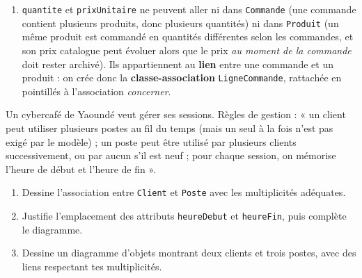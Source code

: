 \documentclass[11pt]{article}
\begin{document}
\begin{exoresolu}
\begin{enumerate}
\begin{center}
\end{center}

\item \texttt{quantite} et \texttt{prixUnitaire} ne peuvent aller ni dans \texttt{Commande} (une commande contient plusieurs produits, donc plusieurs quantités) ni dans \texttt{Produit} (un même produit est commandé en quantités différentes selon les commandes, et son prix catalogue peut évoluer alors que le prix \emph{au moment de la commande} doit rester archivé). Ils appartiennent au \textbf{lien} entre une commande et un produit : on crée donc la \textbf{classe-association} \texttt{LigneCommande}, rattachée en pointillés à l'association \emph{concerner}.
\end{enumerate}
\end{exoresolu}

\begin{exercice}
Un cybercafé de Yaoundé veut gérer ses sessions. Règles de gestion : « un client peut utiliser plusieurs postes au fil du temps (mais un seul à la fois n'est pas exigé par le modèle) ; un poste peut être utilisé par plusieurs clients successivement, ou par aucun s'il est neuf ; pour chaque session, on mémorise l'heure de début et l'heure de fin ».
\begin{enumerate}
\item Dessine l'association entre \texttt{Client} et \texttt{Poste} avec les multiplicités adéquates.
\item Justifie l'emplacement des attributs \texttt{heureDebut} et \texttt{heureFin}, puis complète le diagramme.
\item Dessine un diagramme d'objets montrant deux clients et trois postes, avec des liens respectant tes multiplicités.
\end{enumerate}
\end{exercice}
\end{document}
